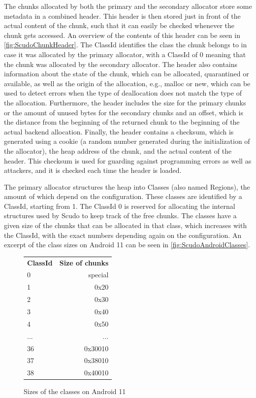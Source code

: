 \documentclass[a4paper,11pt,oneside]{report}
\begin{document}
The chunks allocated by both the primary and the secondary allocator store some
metadata in a combined header. This header is then stored just in front of the
actual content of the chunk, such that it can easily be checked whenever the
chunk gets accessed. An overview of the contents of this header can be seen
in \autoref{fig:ScudoChunkHeader}. The ClassId identifies the class the chunk
belongs to in case it was allocated by the primary allocator, with a ClassId
of 0 meaning that the chunk was allocated by the secondary allocator. The
header also contains information about the state of the chunk, which can be
allocated, quarantined or available, as well as the origin of the allocation,
e.g., malloc or new, which can be used to detect errors when the type of
deallocation does not match the type of the allocation. Furthermore, the
header includes the size for the primary chunks or the amount of unused bytes
for the secondary chunks and an offset, which is the distance from the beginning
of the returned chunk to the beginning of the actual backend allocation.
Finally, the header contains a checksum, which is generated using a cookie (a
random number generated during the initialization of the allocator), the heap
address of the chunk, and the actual content of the header. This checksum is
used for guarding against programming errors as well as attackers, and it is
checked each time the header is loaded.

The primary allocator structures the heap into Classes (also named Regions), the
amount of which depend on the configuration. These classes are identified by a
ClassId, starting from 1. The ClassId 0 is reserved for allocating the internal
structures used by Scudo to keep track of the free chunks.
The classes have a given size of the chunks that can be allocated in that class,
which increases with the ClassId, with the exact numbers depending again on the
configuration. An excerpt of the class sizes on Android 11 can be seen in
\autoref{fig:ScudoAndroidClasses}.

\begin{figure}[h!]
  \centering
  \begin{tabular}{lr}
    \textbf{ClassId} & \textbf{Size of chunks} \\
    0                & special                 \\
    1                & 0x20                    \\
    2                & 0x30                    \\
    3                & 0x40                    \\
    4                & 0x50                    \\
    ...              & ...                     \\
    36               & 0x30010                 \\
    37               & 0x38010                 \\
    38               & 0x40010                
  \end{tabular}
  \caption{Sizes of the classes on Android 11}
  \label{fig:ScudoAndroidClasses}
\end{figure}
\end{document}
